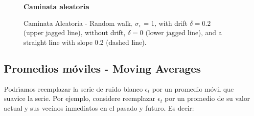 \begin{figure}[H]
	\centering
	\textbf{Caminata aleatoria}\par\medskip
	\caption{Caminata Aleatoria - Random walk, $\sigma_\epsilon$ = 1, with drift $\delta =0 .2$ (upper jagged line), without drift, $\delta = 0$ (lower jagged line), and a straight line with slope 0.2 (dashed line).}\label{figura7}
\end{figure}

\pagebreak\subsection{Promedios m\'oviles - Moving Averages}
Podr\'\i{}amos reemplazar la serie de ruido blanco $\epsilon_t$ por un promedio m\'ovil que suavice la serie. Por ejemplo, considere reemplazar $\epsilon_t$ por un promedio de su valor actual y sus vecinos inmediatos en el pasado y futuro. Es decir:

